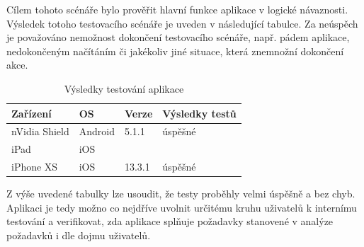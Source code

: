 Cílem tohoto scénáře bylo prověřit hlavní funkce aplikace v logické návaznosti. Výsledek totoho testovacího scénáře je uveden v následující tabulce. Za neúspěch je považováno nemožnost dokončení testovacího scénáře, např. pádem aplikace, nedokončeným načítáním či jakékoliv jiné situace, která znemnožní dokončení akce.

\begin{table}[H]
	\begin{tabularx}{\textwidth}{|X|X|X|X|}
		\hline
		Zařízení        & OS      & Verze  & Výsledky testů \\ \hline
		nVidia Shield   & Android & 5.1.1  & úspěšné \\ \hline
		iPad            & iOS     &        &     \\ \hline
		iPhone XS       & iOS     & 13.3.1 &  úspěšné  \\ \hline
	\end{tabularx}
	\caption{Výsledky testování aplikace}
\end{table}

Z výše uvedené tabulky lze usoudit, že testy proběhly velmi úspěšně a bez chyb. Aplikaci je tedy možno co nejdříve uvolnit určitému kruhu uživatelů k internímu testování a verifikovat, zda aplikace splňuje požadavky stanovené v analýze požadavků i dle dojmu uživatelů.